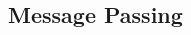 \documentclass[8pt,a4paper,landscape]{extarticle}
\begin{document}
\pagestyle{empty}
\setlength{\abovedisplayskip}{1pt}
\setlength{\belowdisplayskip}{1pt}
\setlength{\abovedisplayshortskip}{0pt}
\setlength{\belowdisplayshortskip}{0pt}

\begin{multicols*}{3}
\section*{Message Passing}
% 

\end{multicols*}
\end{document}
